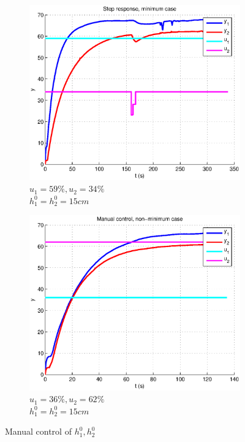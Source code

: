 \begin{figure}[h!t]
        \centering
        \begin{subfigure}[b]{0.45\columnwidth}
                \includegraphics[width=\columnwidth]{fig/manualcontrolmin.eps}
                \caption{$u_1 = 59\%, u_2 = 34\%$ \\ $h_1^0 = h_2^0 = 15cm$}
        \end{subfigure}
        \begin{subfigure}[b]{0.45\columnwidth}
                \includegraphics[width=\columnwidth]{fig/manualcontrolnonmin.eps}
                \caption{$u_1 = 36\%, u_2 = 62\%$ \\ $h_1^0 = h_2^0 = 15cm$}
        \end{subfigure}
        \caption{Manual control of $h_1^0, h_2^0$}
        \label{manualcontrol}
\end{figure}


